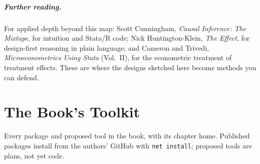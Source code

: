 \documentclass[
    a4paper,
    fontsize=10pt,
    twoside=true,
    numbers=noenddot,
]{kaobook}
\begin{document}
\paragraph{Further reading.} For applied depth beyond this map: Scott Cunningham, \emph{Causal Inference: The Mixtape}, for intuition and Stata/R code; Nick Huntington-Klein, \emph{The Effect}, for design-first reasoning in plain language; and Cameron and Trivedi, \emph{Microeconometrics Using Stata} (Vol.~II), for the econometric treatment of treatment effects. These are where the designs sketched here become methods you can defend.

\chapter{The Book's Toolkit}\label{app:toolkit}
Every package and proposed tool in the book, with its chapter home. Published packages install from the authors' GitHub with \texttt{net install}; proposed tools are plans, not yet code.
\end{document}
